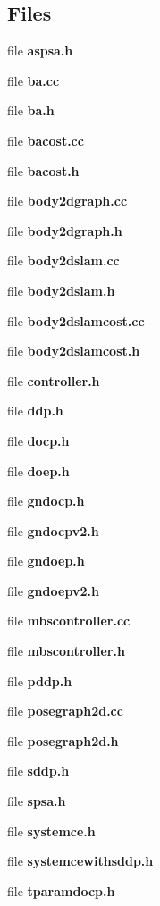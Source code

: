 \subsection*{\-Files}
\begin{DoxyCompactItemize}
\item 
file {\bf aspsa.\-h}
\item 
file {\bf ba.\-cc}
\item 
file {\bf ba.\-h}
\item 
file {\bf bacost.\-cc}
\item 
file {\bf bacost.\-h}
\item 
file {\bf body2dgraph.\-cc}
\item 
file {\bf body2dgraph.\-h}
\item 
file {\bf body2dslam.\-cc}
\item 
file {\bf body2dslam.\-h}
\item 
file {\bf body2dslamcost.\-cc}
\item 
file {\bf body2dslamcost.\-h}
\item 
file {\bf controller.\-h}
\item 
file {\bf ddp.\-h}
\item 
file {\bf docp.\-h}
\item 
file {\bf doep.\-h}
\item 
file {\bf gndocp.\-h}
\item 
file {\bf gndocpv2.\-h}
\item 
file {\bf gndoep.\-h}
\item 
file {\bf gndoepv2.\-h}
\item 
file {\bf mbscontroller.\-cc}
\item 
file {\bf mbscontroller.\-h}
\item 
file {\bf pddp.\-h}
\item 
file {\bf posegraph2d.\-cc}
\item 
file {\bf posegraph2d.\-h}
\item 
file {\bf sddp.\-h}
\item 
file {\bf spsa.\-h}
\item 
file {\bf systemce.\-h}
\item 
file {\bf systemcewithsddp.\-h}
\item 
file {\bf tparamdocp.\-h}
\end{DoxyCompactItemize}
